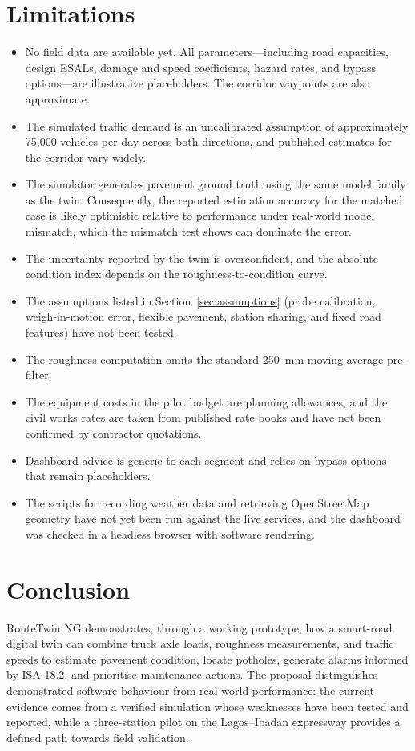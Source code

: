 \documentclass[11pt,a4paper]{article}
\begin{document}
\section{Limitations}
\begin{itemize}
\item No field data are available yet. All parameters---including road capacities, design ESALs, damage and speed coefficients, hazard rates, and bypass options---are illustrative placeholders. The corridor waypoints are also approximate.
\item The simulated traffic demand is an uncalibrated assumption of approximately 75,000 vehicles per day across both directions, and published estimates for the corridor vary widely.
\item The simulator generates pavement ground truth using the same model family as the twin. Consequently, the reported estimation accuracy for the matched case is likely optimistic relative to performance under real-world model mismatch, which the mismatch test shows can dominate the error.
\item The uncertainty reported by the twin is overconfident, and the absolute condition index depends on the roughness-to-condition curve.
\item The assumptions listed in Section~\ref{sec:assumptions} (probe calibration, weigh-in-motion error, flexible pavement, station sharing, and fixed road features) have not been tested.
\item The roughness computation omits the standard 250~mm moving-average pre-filter.
\item The equipment costs in the pilot budget are planning allowances, and the civil works rates are taken from published rate books and have not been confirmed by contractor quotations.
\item Dashboard advice is generic to each segment and relies on bypass options that remain placeholders.
\item The scripts for recording weather data and retrieving OpenStreetMap geometry have not yet been run against the live services, and the dashboard was checked in a headless browser with software rendering.
\end{itemize}

\section{Conclusion}
RouteTwin NG demonstrates, through a working prototype, how a smart-road digital twin can combine truck axle loads, roughness measurements, and traffic speeds to estimate pavement condition, locate potholes, generate alarms informed by ISA-18.2, and prioritise maintenance actions. The proposal distinguishes demonstrated software behaviour from real-world performance: the current evidence comes from a verified simulation whose weaknesses have been tested and reported, while a three-station pilot on the Lagos--Ibadan expressway provides a defined path towards field validation.
\end{document}
